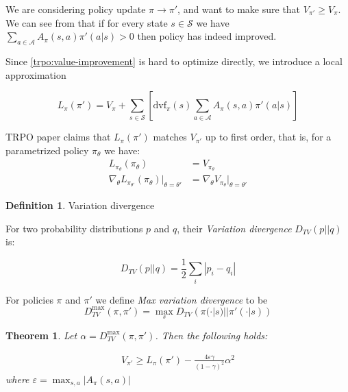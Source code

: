 \documentclass[10pt]{article}
\numberwithin{equation}{subsection}
\newcommand{\MS}{\ensuremath{\mathcal{S}}}
\newcommand{\MA}{\ensuremath{\mathcal{A}}}
\newcommand{\ra}{\ensuremath{\rightarrow}}
\newcommand{\mpi}{\ensuremath{\pi}\xspace}
\newcommand{\mpip}{{\ensuremath{\pi'}}\xspace}
\newcommand{\mpit}{{\ensuremath{\pi_{\theta}}}\xspace}
\newcommand{\mpitp}{{{\ensuremath{\pi_{\theta'}}}}\xspace}
\newcommand{\dvf}{\ensuremath{\textrm{dvf}}}
\theoremstyle{plain}
\newtheorem{theorem}{Theorem}[subsection]
\theoremstyle{definition}
\newtheorem{definition}{Definition}[subsection]
\begin{document}
\begin{sloppypar}
We are considering policy update $\mpi \ra \mpip$, and want to make sure that ${V_\mpip \geq V_\mpi}$.
We can see from that if for every state $s \in \MS$
we have $\sum_{a \in \MA}  A_\mpi(s, a) \mpip(a | s) > 0$
then policy has indeed improved.
\end{sloppypar}

Since \cref{trpo:value-improvement} is hard to optimize directly, we introduce a local approximation

\begin{equation}
L_\mpi(\mpip) = V_\mpi +  \sum_{s \in \MS} \left[   \dvf_\mpi(s)   \sum_{a \in \MA}  A_\mpi(s, a) \mpip(a | s) \right]
\end{equation}

TRPO paper claims that $L_\mpi(\mpip)$ matches $V_\mpip$ up to first order, that is, for a parametrized
policy \mpit we have:
\begin{align}
L_{\mpit}(\mpit) &= V_{\mpit} \\
\nabla_\theta L_{\mpitp}(\mpi_\theta) |_{\theta = \theta'} &= \nabla_\theta V_{\mpi_\theta} |_{\theta = \theta'}
\end{align}

\begin{definition}{Variation divergence}

\label{trpo:variation-divergence}
\begin{sloppypar}
For two probability distributions $p$ and $q$, their \emph{Variation divergence} $D_{TV}(p || q)$
 is:
 \end{sloppypar}
 \begin{equation}
 D_{TV}(p || q) = \frac{1}{2} \sum_i |p_i - q_i|
 \end{equation}
 
For policies \mpi and \mpip we define \emph{Max variation divergence} to be
\begin{equation}
D_{TV}^{\max}(\mpi, \mpip) = \max_s D_{TV}\left(\mpi(\cdot | s) || \mpip(\cdot|s) \right)
\end{equation}
\end{definition}

\begin{theorem}
Let $\alpha = D_{TV}^{\max}(\mpi, \mpip)$. Then the following holds:

\begin{align}
V_\mpip \geq L_\mpi(\mpip) - \frac{4 \varepsilon\gamma}{(1 - \gamma)^2}\alpha^2
\end{align}
where
$ \varepsilon = \max_{s,a} |A_\mpi(s,a)|$
\end{theorem}
\end{document}
